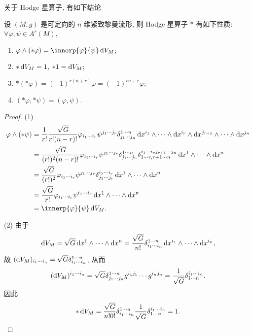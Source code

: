 关于 Hodge 星算子, 有如下结论
\begin{lemma}
  设 $(M,g)$ 是可定向的 $n$ 维紧致黎曼流形, 则 Hodge 星算子 $*$ 有如下性质: 
  $\forall \varphi,\psi\in A^r(M)$,
  \begin{enumerate}[(1)]
    \item $\varphi\wedge(*\varphi) = \innerp{\varphi}{\psi}\diff V_M$;
    \item $*\mathop{}\!\mathrm{d} V_M=1$, $*1=\mathop{}\!\mathrm{d} V_M$;
    \item $*(*\varphi) = (-1)^{r(n+r)}\varphi = (-1)^{rn+r}\varphi$;
    \item $(*\varphi,*\psi) = (\varphi,\psi)$.
  \end{enumerate}
\end{lemma}

\begin{proof}
  (1)
  \begin{align*}
    \varphi\wedge(*\psi)
      & = \frac{1}{r!}\frac{\sqrt{G}}{r!(n-r)!}\varphi_{i_1\cdots i_r}
        \psi^{j_1\cdots j_r}\delta_{j_1\cdots j_n}^{1\cdots n}
        \diff x^{i_1}\wedge\cdots\wedge\diff x^{i_r}
        \wedge\diff x^{j_{r+1}}\wedge\cdots\wedge\diff x^{j_n} \\
      & = \frac{\sqrt{G}}{(r!)^2(n-r)!}\varphi_{i_1\cdots i_r}
        \psi^{j_1\cdots j_r}\delta_{j_1\cdots j_n}^{1\cdots n}
        \delta_{1\cdots r,r+1\cdots n}^{i_1\cdots i_r j_{r+1}\cdots j_n}
        \diff x^1\wedge\cdots\wedge\diff x^n \\
      & = \frac{\sqrt{G}}{(r!)^2}\varphi_{i_1\cdots i_r}\psi^{j_1\cdots j_r}
        \delta_{j_1\cdots j_r}^{i_1\cdots i_r}
        \diff x^1\wedge\cdots\wedge\diff x^n \\
      & = \frac{\sqrt{G}}{r!}\varphi_{i_1\cdots i_r}\psi^{i_1\cdots i_r}
        \diff x^1\wedge\cdots\wedge\diff x^n \\
      & = \innerp{\varphi}{\psi}\diff V_M.
  \end{align*}

  (2) 由于
  \[\mathop{}\!\mathrm{d} V_M = \sqrt{G}\mathop{}\!\mathrm{d} x^1\wedge\cdots\wedge\mathop{}\!\mathrm{d} x^n
    = \frac{\sqrt{G}}{n!}\delta_{i_1\cdots i_n}^{1\cdots n}
    \mathop{}\!\mathrm{d} x^{i_1}\wedge\cdots\wedge\mathop{}\!\mathrm{d} x^{i_n},\]
  故 $(\mathop{}\!\mathrm{d} V_M)_{i_1\cdots i_n} = \sqrt{G}\delta_{i_1\cdots i_n}^{1\cdots n}$, 从而
  \[(\mathop{}\!\mathrm{d} V_M)^{i_1\cdots i_n} = \sqrt{G}\delta_{j_1\cdots j_n}^{1\cdots n}
    g^{i_1j_1}\cdots g^{i_nj_n} = \frac{1}{\sqrt{G}}\delta_{1\cdots n}^{i_1\cdots i_n}.\]
  因此
  \[*\mathop{}\!\mathrm{d} V_M = \frac{\sqrt{G}}{n!0!}\delta_{i_1\cdots i_n}^{1\cdots n}
    \frac{1}{\sqrt{G}}\delta_{1\cdots n}^{i_1\cdots i_n} = 1.\]


\end{proof}
